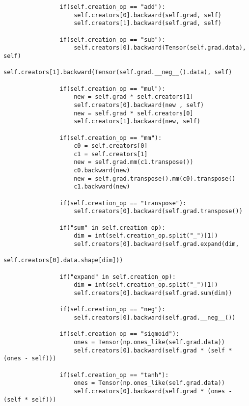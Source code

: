 \documentclass[12pt]{article}
\begin{document}
\begin{verbatim}
                if(self.creation_op == "add"):
                    self.creators[0].backward(self.grad, self)
                    self.creators[1].backward(self.grad, self)
                    
                if(self.creation_op == "sub"):
                    self.creators[0].backward(Tensor(self.grad.data), self)
                    self.creators[1].backward(Tensor(self.grad.__neg__().data), self)

                if(self.creation_op == "mul"):
                    new = self.grad * self.creators[1]
                    self.creators[0].backward(new , self)
                    new = self.grad * self.creators[0]
                    self.creators[1].backward(new, self)                    
                    
                if(self.creation_op == "mm"):
                    c0 = self.creators[0]
                    c1 = self.creators[1]
                    new = self.grad.mm(c1.transpose())
                    c0.backward(new)
                    new = self.grad.transpose().mm(c0).transpose()
                    c1.backward(new)
                    
                if(self.creation_op == "transpose"):
                    self.creators[0].backward(self.grad.transpose())

                if("sum" in self.creation_op):
                    dim = int(self.creation_op.split("_")[1])
                    self.creators[0].backward(self.grad.expand(dim,
                                                               self.creators[0].data.shape[dim]))

                if("expand" in self.creation_op):
                    dim = int(self.creation_op.split("_")[1])
                    self.creators[0].backward(self.grad.sum(dim))
                    
                if(self.creation_op == "neg"):
                    self.creators[0].backward(self.grad.__neg__())
                    
                if(self.creation_op == "sigmoid"):
                    ones = Tensor(np.ones_like(self.grad.data))
                    self.creators[0].backward(self.grad * (self * (ones - self)))
                
                if(self.creation_op == "tanh"):
                    ones = Tensor(np.ones_like(self.grad.data))
                    self.creators[0].backward(self.grad * (ones - (self * self)))
                

\end{verbatim}
\end{document}
